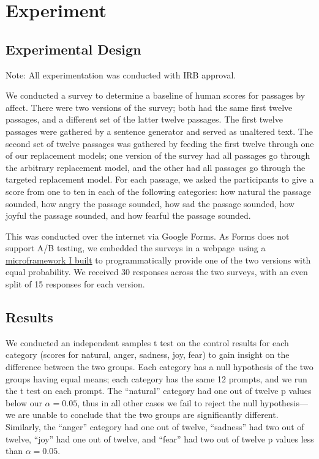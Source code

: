 \documentclass[11pt, twoside, reqno]{book}
\begin{document}
\startmain
\chapter{Experiment}

\section{Experimental Design}

Note: All experimentation was conducted with IRB approval.

We conducted a survey to determine a baseline of human scores for passages by affect. There were two versions of the survey; both had the same first twelve passages, and a different set of the latter twelve passages. The first twelve passages were gathered by a sentence generator and served as unaltered text. The second set of twelve passages was gathered by feeding the first twelve through one of our replacement models; one version of the survey had all passages go through the arbitrary replacement model, and the other had all passages go through the targeted replacement model. For each passage, we asked the participants to give a score from one to ten in each of the following categories: how natural the passage sounded, how angry the passage sounded, how sad the passage sounded, how joyful the passage sounded, and how fearful the passage sounded.

This was conducted over the internet via Google Forms. As Forms does not support A/B testing, we embedded the surveys in a webpage using a \href{https://github.com/colehollant/quarantine-js}{microframework I built} to programmatically provide one of the two versions with equal probability. We received 30 responses across the two surveys, with an even split of 15 responses for each version.

\section{Results}

We conducted an independent samples t test on the control results for each category (scores for natural, anger, sadness, joy, fear) to gain insight on the difference between the two groups. Each category has a null hypothesis of the two groups having equal means; each category has the same 12 prompts, and we run the t test on each prompt. The ``natural'' category had one out of twelve p values below our $\alpha = 0.05$, thus in all other cases we fail to reject the null hypothesis—we are unable to conclude that the two groups are significantly different. Similarly, the ``anger'' category had one out of twelve, ``sadness'' had two out of twelve, ``joy'' had one out of twelve, and ``fear'' had two out of twelve p values less than $\alpha = 0.05$.
\end{document}

